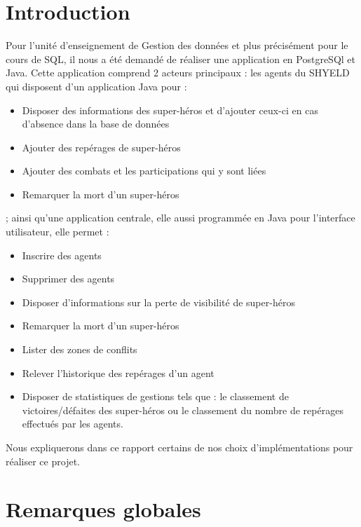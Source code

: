 \documentclass{article}[12pt]
\begin{document}
	
	
	
	\tableofcontents%
	\newpage
	
	
	\section{Introduction}
	Pour l'unité d'enseignement de Gestion des données et plus précisément pour le cours de SQL, il nous a été demandé de réaliser une application en PostgreSQl et Java. Cette application comprend 2 acteurs principaux : les agents du SHYELD qui disposent d'un application Java pour :
	\begin{itemize}
		\item Disposer des informations des super-héros et d'ajouter ceux-ci en cas d'absence dans la base de données
		\item Ajouter des repérages de super-héros
		\item Ajouter des combats et les participations qui y sont liées
		\item Remarquer la mort d'un super-héros
	\end{itemize}
	; ainsi qu'une application centrale, elle aussi programmée en Java pour l'interface utilisateur, elle permet :
	\begin{itemize}
		\item Inscrire des agents
		\item Supprimer des agents
		\item Disposer d'informations sur la perte de visibilité de super-héros
		\item Remarquer la mort d'un super-héros
		\item Lister des zones de conflits
		\item Relever l'historique des repérages d'un agent
		\item Disposer de statistiques de gestions tels que : le classement de victoires/défaites des super-héros ou le classement du nombre de repérages effectués par les agents.
	\end{itemize}
	Nous expliquerons dans ce rapport certains de nos choix d'implémentations pour réaliser ce projet.
	\section{Remarques globales}
\end{document}
